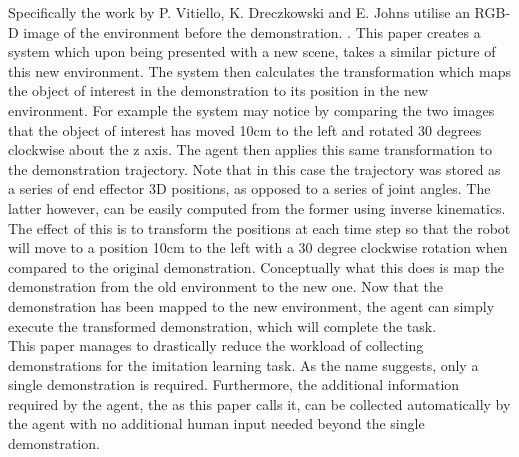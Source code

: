 Specifically the work by P. Vitiello, K. Dreczkowski and E. Johns utilise an RGB-D image of the environment before the demonstration. \cite{one-shot-pose-estimate}. This paper creates a system which upon being presented with a new scene, takes a similar picture of this new environment. The system then calculates the transformation which maps the object of interest in the demonstration to its position in the new environment. For example the system may notice by comparing the two images that the object of interest has moved 10cm to the left and rotated 30 degrees clockwise about the z axis. The agent then applies this same transformation to the demonstration trajectory. Note that in this case the trajectory was stored as a series of end effector 3D positions, as opposed to a series of joint angles. The latter however, can be easily computed from the former using inverse kinematics. The effect of this is to transform the positions at each time step so that the robot will move to a position 10cm to the left with a 30 degree clockwise rotation when compared to the original demonstration. Conceptually what this does is map the demonstration from the old environment to the new one. Now that the demonstration has been mapped to the new environment, the agent can simply execute the transformed demonstration, which will complete the task.\\
This paper manages to drastically reduce the workload of collecting demonstrations for the imitation learning task. As the name  suggests, only a single demonstration is required. Furthermore, the additional information required by the agent, the  as this paper calls it, can be collected automatically by the agent with no additional human input needed beyond the single demonstration.\\

